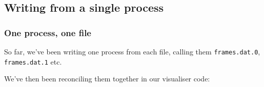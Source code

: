 \begin{Shaded}
\begin{Highlighting}[]

 

   \NormalTok{<} 
  \NormalTok{(}\NormalTok{),}
\NormalTok{\}}
\end{Highlighting}
\end{Shaded}

\begin{Shaded}
\begin{Highlighting}[]

\end{Highlighting}
\end{Shaded}

\subsection{Writing from a single
process}\label{writing-from-a-single-process}

\subsubsection{One process, one file}\label{one-process-one-file}

So far, we've been writing one process from each file, calling them
\texttt{frames.dat.0}, \texttt{frames.dat.1} etc.

\begin{Shaded}
\begin{Highlighting}[]

   
\end{Highlighting}
\end{Shaded}

We've then been reconciling them together in our visualiser code:

\begin{Shaded}
\begin{Highlighting}[]

 
      \NormalTok{+ }

 
\end{Highlighting}
\end{Shaded}

